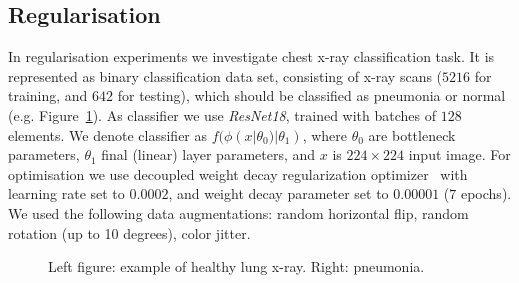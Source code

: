 \documentclass{article}
\begin{document}
\subsection{Regularisation}
In regularisation experiments we investigate chest x-ray classification task. It is represented as binary classification data set, consisting of x-ray scans ($5216$ for training, and $642$ for testing), which should be classified as pneumonia or normal (e.g. Figure~\ref{fig:Pneumonia_dataset_examples}). As classifier we use \emph{ResNet18}, trained with batches of $128$ elements.
We denote classifier as $f(\phi(x|\theta_{0})|\theta_{1})$, where $\theta_{0}$ are bottleneck parameters, $\theta_{1}$ final (linear) layer parameters, and $x$ is $224\times 224$ input image.
For optimisation we use decoupled weight decay regularization optimizer~\cite{Loshchilov2019DecoupledWD} with learning rate set to $0.0002$, and weight decay parameter set to $0.00001$ ($7$ epochs).
We used the following data augmentations: random horizontal flip, random rotation (up to 10 degrees), color jitter.
 
\begin{figure}%
	\centering
	\qquad
	\caption{Left figure: example of healthy lung x-ray. Right: pneumonia.}
	\label{fig:Pneumonia_dataset_examples}
\end{figure}
\end{document}
